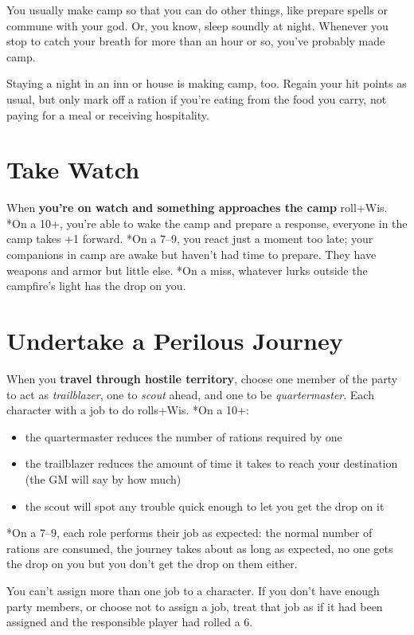 You usually make camp so that you can do other things, like prepare spells or commune with your god. Or, you know, sleep soundly at night. Whenever you stop to catch your breath for more than an hour or so, you've probably made camp.

Staying a night in an inn or house is making camp, too. Regain your hit points as usual, but only mark off a ration if you're eating from the food you carry, not paying for a meal or receiving hospitality.
\section*{Take Watch}
\HRule
When \textbf{you're on watch and something approaches the camp}
roll+Wis. *On a 10+, you're able to wake the camp and prepare a response, everyone in the camp takes +1 forward. *On a 7--9, you react just a moment too late; your companions in camp are awake but haven't had time to prepare. They have weapons and armor but little else. *On a miss, whatever lurks outside the campfire's light has the drop on you.
\HRule
\newpage
\section*{Undertake a Perilous Journey}
\HRule
When you \textbf{travel through hostile territory}, choose one member of the party to act as \emph{trailblazer}, one to \emph{scout} ahead, and one to be \emph{quartermaster}. Each character with a job to do rolls+Wis. *On a 10+:
\begin{itemize}
\item the quartermaster reduces the number of rations required by one
\item the trailblazer reduces the amount of time it takes to reach your destination (the GM will say by how much)
\item the scout will spot any trouble quick enough to let you get the drop on it
\end{itemize}
\HRule

*On a 7--9, each role performs their job as expected: the normal number of rations are consumed, the journey takes about as long as expected, no one gets the drop on you but you don't get the drop on them either.

You can't assign more than one job to a character. If you don't have enough party members, or choose not to assign a job, treat that job as if it had been assigned and the responsible player had rolled a 6.

